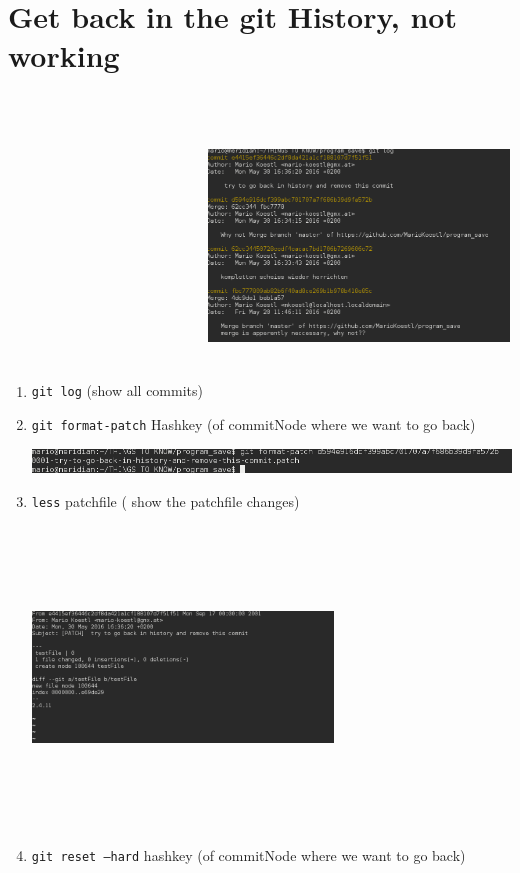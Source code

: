 \documentclass[ twoside,openright,titlepage,numbers=noenddot,headinclude,%
                footinclude=true, cleardoublepage=empty,abstractoff, %
                BCOR=5mm,paper=a4,fontsize=11pt,%
                ]{scrreprt}
\begin{document}
\section{Get back in the git History, not working}
	\begin{enumerate}
		\item \texttt{git log} (show all commits)
			\includegraphics[width=8cm,height=8cm]{pictures/gitLog.png}
		\item \texttt{git format-patch} Hashkey  (of commitNode where we want to go back)
		
			\includegraphics[scale=0.5]{pictures/patchFileCreated.png}
		\item \texttt{less} patchfile ( show the patchfile changes)
		
			\includegraphics[width=8cm,height=8cm]{pictures/patchFile.png}
		\item \texttt{git reset --hard} hashkey (of commitNode where we want to go back)
		

\end{enumerate}
\end{document}
